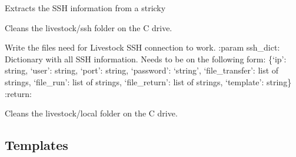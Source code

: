\documentclass[letterpaper,10pt,english]{sphinxmanual}
\begin{document}
\begin{fulllineitems}
\label{\detokenize{lib:livestock.lib.ssh.get_ssh}}
Extracts the SSH information from a stricky

\end{fulllineitems}


\begin{fulllineitems}
\label{\detokenize{lib:livestock.lib.ssh.clean_ssh_folder}}
Cleans the livestock/ssh folder on the C drive.

\end{fulllineitems}


\begin{fulllineitems}
\label{\detokenize{lib:livestock.lib.ssh.write_ssh_commands}}
Write the files need for Livestock SSH connection to work.
:param ssh\_dict: Dictionary with all SSH information. Needs to be on the following form:
\{‘ip’: string, ‘user’: string, ‘port’: string, ‘password’: ‘string’, ‘file\_transfer’: list of strings,
‘file\_run’: list of strings, ‘file\_return’: list of strings, ‘template’: string\}
:return:

\end{fulllineitems}


\begin{fulllineitems}
\label{\detokenize{lib:livestock.lib.ssh.clean_local_folder}}
Cleans the livestock/local folder on the C drive.

\end{fulllineitems}



\subsection{Templates}
\label{\detokenize{lib:module-livestock.lib.templates}}\label{\detokenize{lib:templates}}
\end{document}
